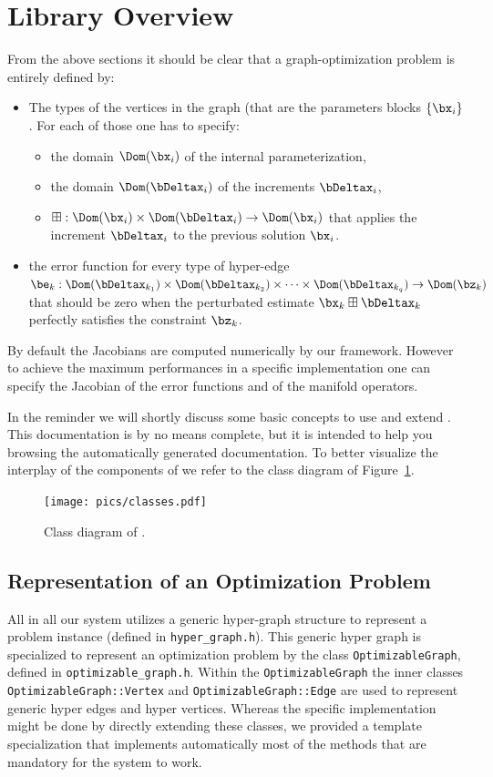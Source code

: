 \documentclass[a4paper]{article}
\begin{document}
\section{Library Overview}
From the above sections it should be clear that a graph-optimization problem is entirely defined by:
\begin{itemize}
\item The types of the vertices in the graph (that are the parameters blocks $\{\bx_i\}$.
  For each of those one has to specify:
  \begin{itemize}
    \item the domain $\Dom(\bx_i)$ of the internal parameterization,
    \item the domain $\Dom(\bDeltax_i)$ of the increments $\bDeltax_i$,
    \item $\boxplus: \Dom(\bx_i) \times \Dom(\bDeltax_i) \rightarrow \Dom(\bx_i)$ that
      applies the increment $\bDeltax_i$ to the previous solution $\bx_i$.
  \end{itemize}
\item the error function for every type of hyper-edge
  $\be_{k}:\Dom(\bDeltax_{k_1}) \times \Dom(\bDeltax_{k_2}) \times \dots \times
  \Dom(\bDeltax_{k_q}) \rightarrow \Dom(\bz_{k})$ that should be zero when
  the perturbated estimate $\bx_{k} \boxplus \bDeltax_{k}$ perfectly satisfies the constraint $\bz_{k}$.
\end{itemize}
By default the Jacobians are computed numerically by our
framework. However to achieve the maximum performances in a specific
implementation one can specify the Jacobian of the error functions and
of the manifold operators.

In the reminder we will shortly discuss some basic concepts to use and
extend \gopt.  This documentation is by no means complete, but it is
intended to help you browsing the automatically generated
documentation. To better visualize the interplay of the components of
\gopt{} we refer to the class diagram of Figure~\ref{fig:classes}.
\begin{figure}
\centering
\texttt{[image: pics/classes.pdf]}
\caption{Class diagram of \gopt{}.}
\label{fig:classes}
\end{figure}

\subsection {Representation of an Optimization Problem}
\label{sec:representation}
All in all our system utilizes a generic hyper-graph structure to
represent a problem instance (defined in \verb+hyper_graph.h+).  This
generic hyper graph is specialized to represent an optimization
problem by the class \verb+OptimizableGraph+, defined in
\verb+optimizable_graph.h+.  Within the \verb+OptimizableGraph+ the
inner classes \verb+OptimizableGraph::Vertex+ and
\verb+OptimizableGraph::Edge+ are used to represent generic hyper
edges and hyper vertices.  Whereas the specific implementation might
be done by directly extending these classes, we provided a template
specialization that implements automatically most of the methods that
are mandatory for the system to work.
\end{document}
